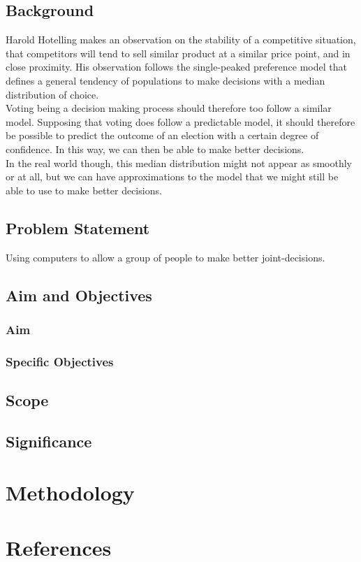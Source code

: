 \documentclass[12pt, a4paper]{report}
\begin{document}
\subsection*{Background}
Harold Hotelling makes an observation on the stability of a competitive situation, that
competitors will tend to sell similar product at a similar price point, and in close proximity.
His observation follows the single-peaked preference model that defines a general tendency
of populations to make decisions with a median distribution of choice.\cite{bib:Hot29}\\

Voting being a decision making process should therefore too follow a similar model. Supposing
that voting does follow a predictable model, it should therefore be possible to predict
the outcome of an election with a certain degree of confidence. In this way, we can then
be able to make better decisions.\\

In the real world though, this median distribution might not appear as smoothly or at all,
but we can have approximations to the model that we might still be able to use to make
better decisions.
\subsection*{Problem Statement}
Using computers to allow a group of people to make better joint-decisions.
\subsection*{Aim and Objectives}
\subsubsection*{Aim}
\subsubsection*{Specific Objectives}
\subsection*{Scope}
\subsection*{Significance}
\section*{Methodology}
\section*{References}
\printbibliography[heading=subbibintoc]
\end{document}

